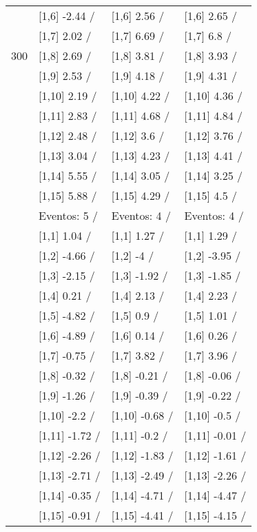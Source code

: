 \begin{table}
\begin{tabular}[t]{llll}
 & {}[1,6] -2.44  / & {}[1,6] 2.56  / & {}[1,6] 2.65  /\\
 & {}[1,7] 2.02  / & {}[1,7] 6.69  / & {}[1,7] 6.8  /\\
300 & {}[1,8] 2.69  / & {}[1,8] 3.81  / & {}[1,8] 3.93  /\\
\addlinespace
 & {}[1,9] 2.53  / & {}[1,9] 4.18  / & {}[1,9] 4.31  /\\
 & {}[1,10] 2.19  / & {}[1,10] 4.22  / & {}[1,10] 4.36  /\\
 & {}[1,11] 2.83  / & {}[1,11] 4.68  / & {}[1,11] 4.84  /\\
 & {}[1,12] 2.48  / & {}[1,12] 3.6  / & {}[1,12] 3.76  /\\
 & {}[1,13] 3.04  / & {}[1,13] 4.23  / & {}[1,13] 4.41  /\\
\addlinespace
 & {}[1,14] 5.55  / & {}[1,14] 3.05  / & {}[1,14] 3.25  /\\
 & {}[1,15] 5.88  / & {}[1,15] 4.29  / & {}[1,15] 4.5  /\\
 & Eventos:  5 / & Eventos:  4 / & Eventos:  4 /\\
 & {}[1,1] 1.04  / & {}[1,1] 1.27  / & {}[1,1] 1.29  /\\
 & {}[1,2] -4.66  / & {}[1,2] -4  / & {}[1,2] -3.95  /\\
\addlinespace
 & {}[1,3] -2.15  / & {}[1,3] -1.92  / & {}[1,3] -1.85  /\\
 & {}[1,4] 0.21  / & {}[1,4] 2.13  / & {}[1,4] 2.23  /\\
 & {}[1,5] -4.82  / & {}[1,5] 0.9  / & {}[1,5] 1.01  /\\
 & {}[1,6] -4.89  / & {}[1,6] 0.14  / & {}[1,6] 0.26  /\\
 & {}[1,7] -0.75  / & {}[1,7] 3.82  / & {}[1,7] 3.96  /\\
\addlinespace
500 & {}[1,8] -0.32  / & {}[1,8] -0.21  / & {}[1,8] -0.06  /\\
 & {}[1,9] -1.26  / & {}[1,9] -0.39  / & {}[1,9] -0.22  /\\
 & {}[1,10] -2.2  / & {}[1,10] -0.68  / & {}[1,10] -0.5  /\\
 & {}[1,11] -1.72  / & {}[1,11] -0.2  / & {}[1,11] -0.01  /\\
 & {}[1,12] -2.26  / & {}[1,12] -1.83  / & {}[1,12] -1.61  /\\
\addlinespace
 & {}[1,13] -2.71  / & {}[1,13] -2.49  / & {}[1,13] -2.26  /\\
 & {}[1,14] -0.35  / & {}[1,14] -4.71  / & {}[1,14] -4.47  /\\
 & {}[1,15] -0.91  / & {}[1,15] -4.41  / & {}[1,15] -4.15  /\\
\bottomrule
\end{tabular}
\end{table}
